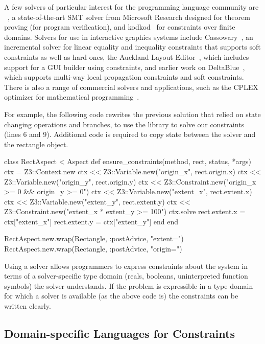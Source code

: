 A few solvers of particular interest for the programming language
community are \zthree~\cite{de2008z3}, a state-of-the-art SMT solver
from Microsoft Research designed for theorem proving (\eg for program
verification), and kodkod~\cite{torlak2007kodkod} for constraints over
finite domains.  Solvers for use in interactive graphics systems
include Cassowary~\cite{badros-tochi-2001}, an incremental solver for
linear equality and inequality constraints that supports soft
constraints as well as hard ones, the Auckland Layout
Editor~\cite{lutteroth2008end}, which includes support for a GUI
builder using constraints, and earlier work on
DeltaBlue~\cite{freeman-benson-phoenix-1989}, which supports multi-way
local propagation constraints and soft constraints.  There is also a
range of commercial solvers and applications, such as the CPLEX
optimizer for mathematical programming~\cite{optimization1993using}.

For example, the following code rewrites the previous solution that
relied on state changing operations and branches, to use the \zthree
library to solve our constraints (lines 6 and 9). Additional code is
required to copy state between the solver and the rectangle object.
\begin{code}
class RectAspect < Aspect
  def ensure_constraints(method, rect, status, *args)
    ctx = Z3::Context.new
    ctx << Z3::Variable.new("origin_x", rect.origin.x)
    ctx << Z3::Variable.new("origin_y", rect.origin.y)
    ctx << Z3::Constraint.new("origin_x >= 0 && origin_y >= 0")
    ctx << Z3::Variable.new("extent_x", rect.extent.x)
    ctx << Z3::Variable.new("extent_y", rect.extent.y)
    ctx << Z3::Constraint.new("extent_x * extent_y >= 100")
    ctx.solve
    rect.extent.x = ctx["extent_x"]
    rect.extent.y = ctx["extent_y"]
  end
end

RectAspect.new.wrap(Rectangle, :postAdvice, "extent=")
RectAspect.new.wrap(Rectangle, :postAdvice, "origin=")
\end{code}

Using a solver allows programmers to express constraints about the
system in terms of a solver-specific type domain (\eg reals, booleans,
uninterpreted function symbols) the solver understands. If the problem
is expressible in a type domain for which a solver is available (as
the above code is) the constraints can be written clearly.

\subsection{Domain-specific Languages for Constraints}

